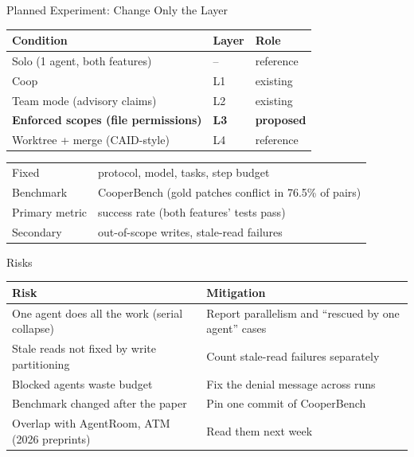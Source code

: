 \documentclass[aspectratio=169,11pt]{beamer}
\begin{document}
\begin{frame}{Planned Experiment: Change Only the Layer}
  \centering
  \small
  \begin{tabular}{lll}
    \toprule
    Condition & Layer & Role \\
    \midrule
    Solo (1 agent, both features) & -- & reference \\
    Coop & L1 & existing \\
    Team mode (advisory claims) & L2 & existing \\
    \textbf{Enforced scopes (file permissions)} & \textbf{L3} & \textbf{proposed} \\
    Worktree + merge (CAID-style) & L4 & reference \\
    \bottomrule
  \end{tabular}

  \vspace{1em}
  \begin{tabular}{ll}
    Fixed & protocol, model, tasks, step budget \\
    Benchmark & CooperBench (gold patches conflict in 76.5\% of pairs) \\
    Primary metric & success rate (both features' tests pass) \\
    Secondary & out-of-scope writes, stale-read failures \\
  \end{tabular}
\end{frame}

\begin{frame}{Risks}
  \centering
  \small
  \begin{tabularx}{\textwidth}{l X}
    \toprule
    Risk & Mitigation \\
    \midrule
    One agent does all the work (serial collapse) & Report parallelism and ``rescued by one agent'' cases \\
    Stale reads not fixed by write partitioning & Count stale-read failures separately \\
    Blocked agents waste budget & Fix the denial message across runs \\
    Benchmark changed after the paper & Pin one commit of CooperBench \\
    Overlap with AgentRoom, ATM (2026 preprints) & Read them next week \\
    \bottomrule
  \end{tabularx}
\end{frame}
\end{document}
